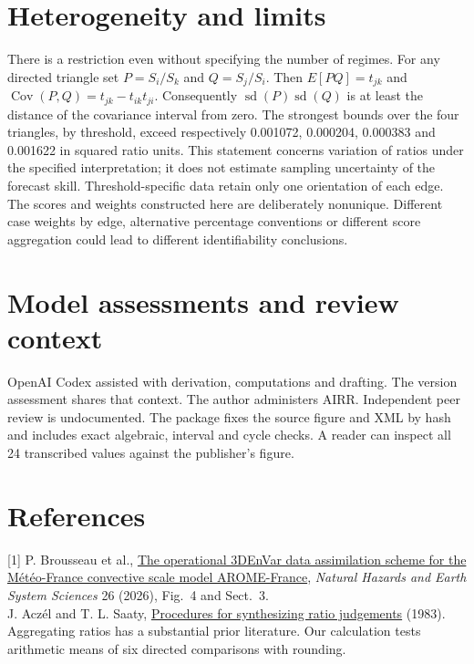 \documentclass[11pt]{article}
\begin{document}
\section{Heterogeneity and limits}
There is a restriction even without specifying the number of regimes. For any directed triangle set $P=S_i/S_k$ and $Q=S_j/S_i$. Then $E[PQ]=t_{jk}$ and $\operatorname{Cov}(P,Q)=t_{jk}-t_{ik}t_{ji}$. Consequently $\operatorname{sd}(P)\operatorname{sd}(Q)$ is at least the distance of the covariance interval from zero. The strongest bounds over the four triangles, by threshold, exceed respectively 0.001072, 0.000204, 0.000383 and 0.001622 in squared ratio units. This statement concerns variation of ratios under the specified interpretation; it does not estimate sampling uncertainty of the forecast skill. Threshold-specific data retain only one orientation of each edge. The scores and weights constructed here are deliberately nonunique. Different case weights by edge, alternative percentage conventions or different score aggregation could lead to different identifiability conclusions.

\section*{Model assessments and review context}
OpenAI Codex assisted with derivation, computations and drafting. The version assessment shares that context. The author administers AIRR. Independent peer review is undocumented. The package fixes the source figure and XML by hash and includes exact algebraic, interval and cycle checks. A reader can inspect all 24 transcribed values against the publisher's figure.
\section*{References}
\small
[1] P. Brousseau et al., \href{https://doi.org/10.5194/nhess-26-5769-2026}{The operational 3DEnVar data assimilation scheme for the M\'et\'eo-France convective scale model AROME-France}, \emph{Natural Hazards and Earth System Sciences} 26 (2026), Fig.~4 and Sect.~3.\\
{}\relax [2] J. Acz\'el and T. L. Saaty, \href{https://doi.org/10.1016/0022-2496(83)90028-7}{Procedures for synthesizing ratio judgements} (1983). Aggregating ratios has a substantial prior literature. Our calculation tests arithmetic means of six directed comparisons with rounding.
\end{document}
